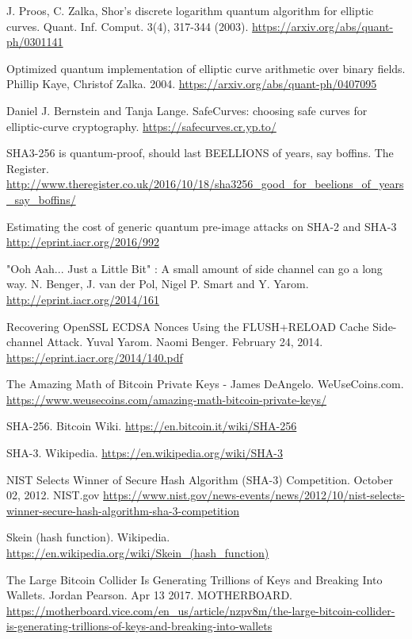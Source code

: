 \documentclass[11pt]{article}
\begin{document}
\begin{thebibliography}{7}
J. Proos, C. Zalka, Shor's discrete logarithm quantum algorithm for elliptic curves. Quant. Inf. Comput. 3(4), 317-344 (2003).
\url{https://arxiv.org/abs/quant-ph/0301141}

Optimized quantum implementation of elliptic curve arithmetic over binary fields. Phillip Kaye, Christof Zalka. 2004.
\url{https://arxiv.org/abs/quant-ph/0407095}

Daniel J. Bernstein and Tanja Lange. SafeCurves: choosing safe curves for elliptic-curve cryptography.
\url{https://safecurves.cr.yp.to/}

SHA3-256 is quantum-proof, should last BEELLIONS of years, say boffins. The Register.
\url{http://www.theregister.co.uk/2016/10/18/sha3256_good_for_beelions_of_years_say_boffins/}

Estimating the cost of generic quantum pre-image attacks on SHA-2 and SHA-3
\url{http://eprint.iacr.org/2016/992}

"Ooh Aah... Just a Little Bit" : A small amount of side channel can go a long way. N. Benger, J. van der Pol, Nigel P. Smart and Y. Yarom.
\url{http://eprint.iacr.org/2014/161}

Recovering OpenSSL ECDSA Nonces Using the FLUSH+RELOAD Cache Side-channel Attack. Yuval Yarom. Naomi Benger. February 24, 2014.
\url{https://eprint.iacr.org/2014/140.pdf}

The Amazing Math of Bitcoin Private Keys - James DeAngelo. WeUseCoins.com.
\url{https://www.weusecoins.com/amazing-math-bitcoin-private-keys/}

SHA-256. Bitcoin Wiki.
\url{https://en.bitcoin.it/wiki/SHA-256}

SHA-3. Wikipedia.
\url{https://en.wikipedia.org/wiki/SHA-3}

NIST Selects Winner of Secure Hash Algorithm (SHA-3) Competition. October 02, 2012. NIST.gov
\url{https://www.nist.gov/news-events/news/2012/10/nist-selects-winner-secure-hash-algorithm-sha-3-competition}

Skein (hash function). Wikipedia.
\url{https://en.wikipedia.org/wiki/Skein_(hash_function)}

The Large Bitcoin Collider Is Generating Trillions of Keys and Breaking Into Wallets. Jordan Pearson. Apr 13 2017. MOTHERBOARD.
\url{https://motherboard.vice.com/en_us/article/nzpv8m/the-large-bitcoin-collider-is-generating-trillions-of-keys-and-breaking-into-wallets}


\end{thebibliography}
\end{document}

